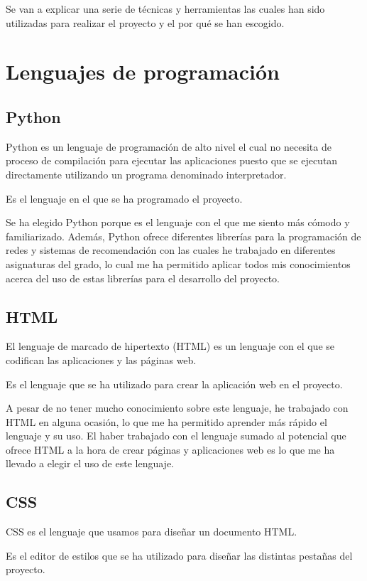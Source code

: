 
Se van a explicar una serie de técnicas y herramientas las cuales han sido utilizadas para realizar el proyecto y el por qué se han escogido.

\section{Lenguajes de programación}
\subsection{Python}
Python \cite{wiki:python} es un lenguaje de programación de alto nivel el cual no necesita de proceso de compilación para ejecutar las aplicaciones puesto que se ejecutan directamente utilizando un programa denominado interpretador.

Es el lenguaje en el que se ha programado el proyecto.

Se ha elegido Python porque es el lenguaje con el que me siento más cómodo y familiarizado. Además, Python ofrece diferentes librerías para la programación de redes y sistemas de recomendación con las cuales he trabajado en diferentes asignaturas del grado, lo cual me ha permitido aplicar todos mis conocimientos acerca del uso de estas librerías para el desarrollo del proyecto. 

\subsection{HTML}
El lenguaje de marcado de hipertexto (HTML) \cite{wiki:html} es un lenguaje con el que se codifican las aplicaciones y las páginas web.

Es el lenguaje que se ha utilizado para crear la aplicación web en el proyecto.

A pesar de no tener mucho conocimiento sobre este lenguaje, he trabajado con HTML en alguna ocasión, lo que me ha permitido aprender más rápido el lenguaje y su uso. El haber trabajado con el lenguaje sumado al potencial que ofrece HTML a la hora de crear páginas y aplicaciones web es lo que me ha llevado a elegir el uso de este lenguaje.

\subsection{CSS}
CSS \cite{wiki:css} es el lenguaje que usamos para diseñar un documento HTML.

Es el editor de estilos que se ha utilizado para diseñar las distintas pestañas del proyecto.

